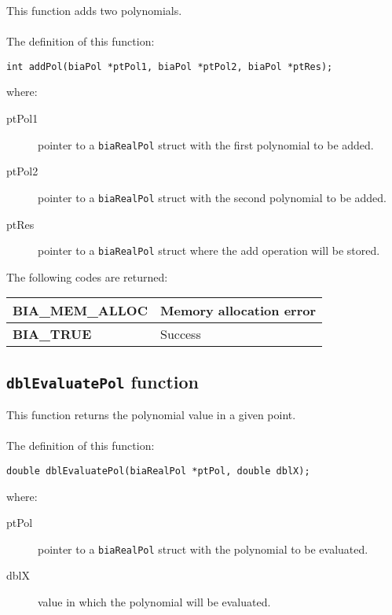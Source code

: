 This function adds two polynomials.\\ \\
%
The definition of this function:
%
\begin{verbatim}
int addPol(biaPol *ptPol1, biaPol *ptPol2, biaPol *ptRes);  
\end{verbatim}
%
where:
%
\begin{description}
\item[ptPol1] pointer to a \texttt{biaRealPol} struct with the first polynomial to be added.
\item[ptPol2] pointer to a \texttt{biaRealPol} struct with the second polynomial to be added.
\item[ptRes] pointer to a \texttt{biaRealPol} struct where the add operation will be stored.
\end{description}
%
The following codes are returned:
%
\begin{center}
\begin{tabular}{|l|l|}
\hline
\textbf{BIA\_MEM\_ALLOC} & Memory allocation error \\
\hline
\textbf{BIA\_TRUE} & Success \\
\hline
\end{tabular}
\end{center}
%
%

\subsection{\texttt{dblEvaluatePol} function}

This function returns the polynomial value in a given point.\\ \\
%
The definition of this function:
%
\begin{verbatim}
double dblEvaluatePol(biaRealPol *ptPol, double dblX);
\end{verbatim}
%
where:
%
\begin{description}
\item[ptPol] pointer to a \texttt{biaRealPol} struct with the polynomial to be evaluated.
\item[dblX] value in which the polynomial will be evaluated.
\end{description}
%
%


